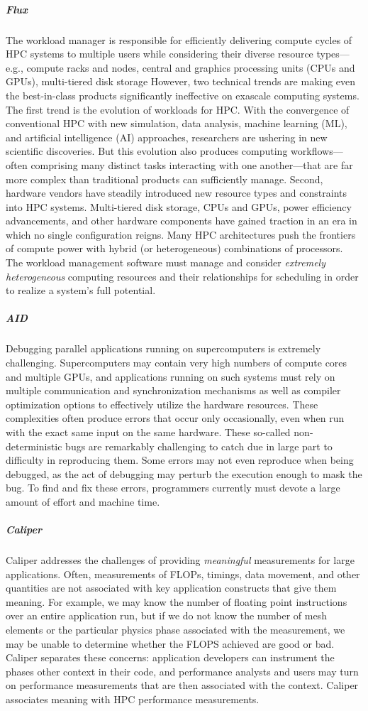 \subparagraph{Flux}
The workload manager is responsible for efficiently
delivering compute cycles of HPC systems to multiple users while considering their
diverse resource types---e.g., compute racks and nodes, central and graphics
processing units (CPUs and GPUs), multi-tiered disk storage
However, two technical trends are making even the best-in-class
products significantly ineffective on exascale computing systems.
The first trend is the evolution of workloads for HPC. With the convergence
of conventional HPC with new simulation, data analysis, machine learning (ML),
and artificial intelligence (AI) approaches, researchers are ushering in
new scientific discoveries. But this evolution also produces computing
workflows---often comprising many distinct tasks interacting with one
another---that are far more complex than traditional products
can sufficiently manage.
Second, hardware vendors have steadily introduced
new resource types and constraints into HPC systems.
Multi-tiered disk storage, CPUs and GPUs,
power efficiency advancements, and other hardware components have gained
traction in an era in which no single configuration reigns. Many HPC
architectures push the frontiers of compute power with hybrid (or
heterogeneous) combinations of processors.
The workload management software must manage and consider {\em extremely heterogeneous} computing
resources and their relationships for scheduling in order to realize a
system's full potential.


\subparagraph{AID}
Debugging parallel applications running on supercomputers is extremely
challenging.  Supercomputers may contain very high
numbers of compute cores and multiple GPUs, and applications running on
such systems must rely on multiple communication and synchronization
mechanisms as well as compiler optimization options to effectively
utilize the hardware resources. These complexities often produce errors
that occur only occasionally, even when run with the exact same input on
the same hardware. These so-called non-deterministic bugs are remarkably
challenging to catch due in large part to difficulty in reproducing
them. Some errors may not even reproduce when being debugged, as the act
of debugging may perturb the execution enough to mask the bug.  To find
and fix these errors, programmers currently must devote a large amount of
effort and machine time.

\subparagraph{Caliper}
Caliper addresses the challenges of providing {\it meaningful}
measurements for large applications.  Often, measurements of FLOPs,
timings, data movement, and other quantities are not associated with key
application constructs that give them meaning.  For example, we may know
the number of floating point instructions over an entire application run,
but if we do not know the number of mesh elements or the particular
physics phase associated with the measurement, we may be unable to
determine whether the FLOPS achieved are good or bad.  Caliper separates
these concerns: application developers can instrument the phases other
context in their code, and performance analysts and users may turn on
performance measurements that are then associated with the context.
Caliper associates meaning with HPC performance measurements.



